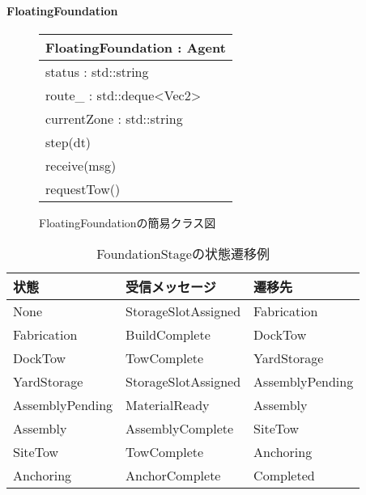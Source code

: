 \documentclass[10pt,letterpaper]{jsarticle}
\begin{document}
\paragraph{FloatingFoundation}
\begin{figure}[htbp]
  \centering
  \begin{tabular}{|l|}
    \hline
    \textbf{FloatingFoundation} : Agent \\
    \hline
    status : std::string \\
    route\_ : std::deque\textless Vec2\textgreater \\
    currentZone : std::string \\
    \hline
    step(dt) \\
    receive(msg) \\
    requestTow() \\
    \hline
  \end{tabular}
  \caption{FloatingFoundationの簡易クラス図}
\end{figure}
\begin{table}[htbp]
  \centering
  \begin{tabular}{lll}
    \toprule
    状態 & 受信メッセージ & 遷移先 \\
    \midrule
    None & StorageSlotAssigned & Fabrication \\
    Fabrication & BuildComplete & DockTow \\
    DockTow & TowComplete & YardStorage \\
    YardStorage & StorageSlotAssigned & AssemblyPending \\
    AssemblyPending & MaterialReady & Assembly \\
    Assembly & AssemblyComplete & SiteTow \\
    SiteTow & TowComplete & Anchoring \\
    Anchoring & AnchorComplete & Completed \\
    \bottomrule
  \end{tabular}
  \caption{FoundationStageの状態遷移例}
\end{table}
\usetikzlibrary{positioning,arrows.meta,matrix}
\end{document}
